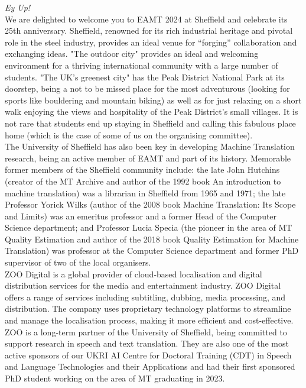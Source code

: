 \textit{Ey Up!}
\\

We are delighted to welcome you to EAMT 2024 at Sheffield and celebrate its 25th anniversary. Sheffield, renowned for its rich industrial heritage and pivotal role in the steel industry, provides an ideal venue for “forging” collaboration and exchanging ideas. "The outdoor city" provides an ideal and welcoming environment for a thriving international community with a large number of students. "The UK's greenest city" has the Peak District National Park at its doorstep, being a not to be missed place for the most adventurous (looking for sports like bouldering and mountain biking) as well as for just relaxing on a short walk enjoying the views and hospitality of the Peak District's small villages. It is not rare that students end up staying in Sheffield and calling this fabulous place home (which is the case of some of us on the organising committee).
\\

The University of Sheffield has also been key in developing Machine Translation research, being an active member of EAMT and part of its history. Memorable former members of the Sheffield community include: the late John Hutchins (creator of the MT Archive and author of the 1992 book An introduction to machine translation) was a librarian in Sheffield from 1965 and 1971; the late Professor Yorick Wilks (author of the 2008 book Machine Translation: Its Scope and Limits) was an emeritus professor and a former Head of the Computer Science department; and Professor Lucia Specia (the pioneer in the area of MT Quality Estimation and author of the 2018 book Quality Estimation for Machine Translation) was professor at the Computer Science department and former PhD supervisor of two of the local organisers. 
\\

ZOO Digital is a global provider of cloud-based localisation and digital distribution services for the media and entertainment industry. ZOO Digital offers a range of services including subtitling, dubbing, media processing, and distribution. The company uses proprietary technology platforms to streamline and manage the localisation process, making it more efficient and cost-effective.  ZOO is a long-term partner of the University of Sheffield, being committed to support research in speech and text translation. They are also one of the most active sponsors of our UKRI AI Centre for Doctoral Training (CDT) in Speech and Language Technologies and their Applications and had their first sponsored PhD student working on the area of MT graduating in 2023.
\\

